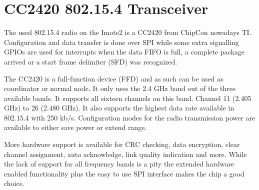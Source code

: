 \section{CC2420 802.15.4 Transceiver}
The used 802.15.4 radio on the Imote2 is a CC2420 from ChipCon nowadays TI.
Configuration and data transfer is done over SPI while some extra signalling
GPIOs are used for interrupts when the data FIFO is full, a complete package
arrived or a start frame delimiter (SFD) was recognized.

The CC2420 is a full-function device (FFD) and as such can be used as
coordinator or normal node. It only uses the 2.4 GHz band out of the three
available bands. It supports all sixteen channels on this band. Channel 11
(2.405 GHz) to 26 (2.480 GHz). It also supports the highest data rate available
in 802.15.4 with 250 kb/s. Configuration modes for the radio transmission power
are available to either save power or extend range.

More hardware support is available for CRC checking, data encryption, clear
channel assignment, auto acknowledge, link quality indication and more. While
the lack of support for all frequency bands is a pity the extended hardware
enabled functionality plus the easy to use SPI interface makes the chip a good
choice.
